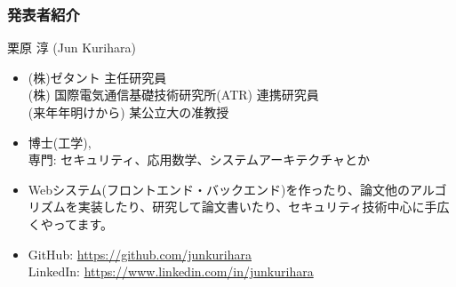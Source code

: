 \begin{frame}
\frametitle{発表者紹介}
{\Large 栗原 淳 (Jun Kurihara)}
\begin{itemize}
 \item (株)ゼタント 主任研究員\\
(株) 国際電気通信基礎技術研究所(ATR) 連携研究員\\
(来年年明けから) 某公立大の准教授
 \item 博士(工学), \\
 専門: セキュリティ、応用数学、システムアーキテクチャとか
 \item  Webシステム(フロントエンド・バックエンド)を作ったり、論文他のアルゴリズムを実装したり、研究して論文書いたり、セキュリティ技術中心に手広くやってます。
 \item GitHub: \url{https://github.com/junkurihara}\\
LinkedIn: \url{https://www.linkedin.com/in/junkurihara}
\end{itemize}
\end{frame}